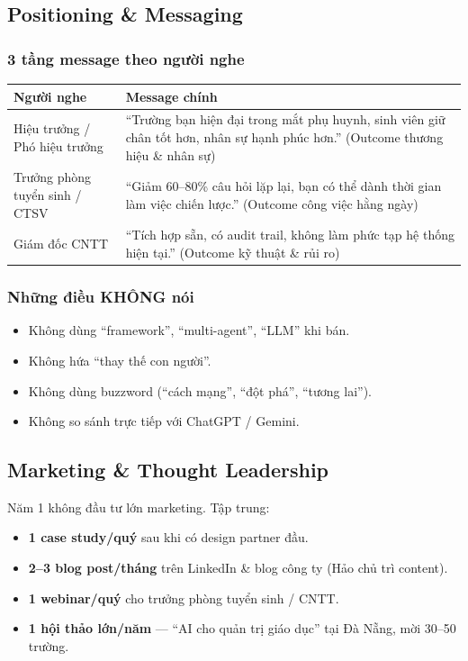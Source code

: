 \documentclass[11pt,a4paper]{article}
\begin{document}
\subsection{Positioning \& Messaging}

\subsubsection*{3 tầng message theo người nghe}

\begin{tabularx}{\linewidth}{@{}p{3.5cm} X@{}}
\toprule
\textbf{Người nghe} & \textbf{Message chính} \\
\midrule
Hiệu trưởng / Phó hiệu trưởng & ``Trường bạn hiện đại trong mắt phụ huynh, sinh viên giữ chân tốt hơn, nhân sự hạnh phúc hơn.'' (Outcome thương hiệu \& nhân sự) \\
Trưởng phòng tuyển sinh / CTSV & ``Giảm 60--80\% câu hỏi lặp lại, bạn có thể dành thời gian làm việc chiến lược.'' (Outcome công việc hằng ngày) \\
Giám đốc CNTT & ``Tích hợp sẵn, có audit trail, không làm phức tạp hệ thống hiện tại.'' (Outcome kỹ thuật \& rủi ro) \\
\bottomrule
\end{tabularx}

\subsubsection*{Những điều KHÔNG nói}

\begin{itemize}
\item Không dùng ``framework'', ``multi-agent'', ``LLM'' khi bán.
\item Không hứa ``thay thế con người''.
\item Không dùng buzzword (``cách mạng'', ``đột phá'', ``tương lai'').
\item Không so sánh trực tiếp với ChatGPT / Gemini.
\end{itemize}

\subsection{Marketing \& Thought Leadership}

Năm 1 không đầu tư lớn marketing. Tập trung:

\begin{itemize}
\item \textbf{1 case study/quý} sau khi có design partner đầu.
\item \textbf{2--3 blog post/tháng} trên LinkedIn \& blog công ty (Hảo chủ trì content).
\item \textbf{1 webinar/quý} cho trưởng phòng tuyển sinh / CNTT.
\item \textbf{1 hội thảo lớn/năm} --- ``AI cho quản trị giáo dục'' tại Đà Nẵng, mời 30--50 trường.
\end{itemize}
\end{document}
